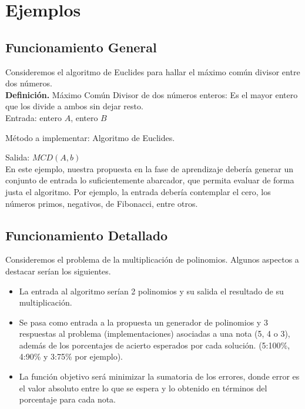 \documentclass[a4paper,12pt]{book}
\begin{document}
	\section{Ejemplos}
	
	\subsection{Funcionamiento General}
	
		Consideremos el algoritmo de Euclides para hallar el máximo común divisor entre dos números.\\
		
		\textbf{Definición.} Máximo Común Divisor de dos números enteros: Es el mayor entero que los divide a ambos sin dejar resto. \\
		
		Entrada: entero $A$, entero $B$ 
		
		Método a implementar: Algoritmo de Euclides.
		
		Salida: $MCD(A, b)$ \\
		
		En este ejemplo, nuestra propuesta en la fase de aprendizaje debería generar un conjunto de entrada lo suficientemente abarcador, que permita evaluar de forma justa el algoritmo. Por ejemplo, la entrada debería contemplar el cero, los números primos, negativos, de Fibonacci, entre otros.
		
	\subsection{Funcionamiento Detallado}
	
		Consideremos el problema de la multiplicación de polinomios. Algunos aspectos a destacar serían los siguientes.
		\begin{itemize}
			\item La entrada al algoritmo serían 2 polinomios y su salida el resultado de su multiplicación.
			\item Se pasa como entrada a la propuesta un generador de polinomios y 3 respuestas al problema (implementaciones) asociadas a una nota (5, 4 o 3), además de los porcentajes de acierto esperados por cada solución. (5:100\%, 4:90\% y 3:75\% por ejemplo).
			\item La función objetivo será minimizar la sumatoria de los errores, donde error es el valor absoluto entre lo que se espera y lo obtenido en términos del porcentaje para cada nota.
		\end{itemize}
	
\end{document}
